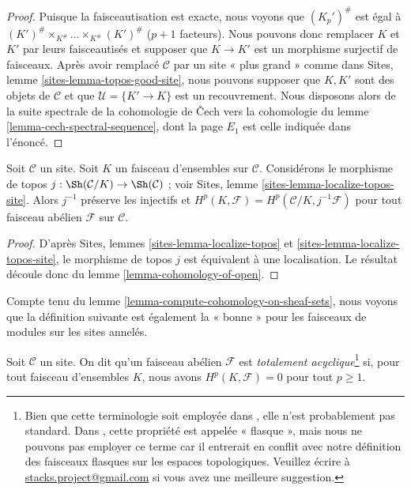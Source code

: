 \begin{proof}
Puisque la faisceautisation est exacte, nous voyons que
$(K_p')^\#$ est égal à
$(K')^\# \times_{K^\#} \ldots \times_{K^\#} (K')^\#$
($p + 1$ facteurs). Nous pouvons donc remplacer $K$ et $K'$ par leurs
faisceautisés et supposer que $K \to K'$ est un morphisme surjectif de
faisceaux. Après avoir remplacé $\mathcal{C}$ par un site « plus grand » comme
dans Sites, lemme \ref{sites-lemma-topos-good-site}, nous pouvons supposer que
$K, K'$ sont des objets de $\mathcal{C}$ et que
$\mathcal{U} = \{K' \to K\}$ est un recouvrement. Nous disposons alors de la
suite spectrale de la cohomologie de {\v C}ech vers la cohomologie du
lemme \ref{lemma-cech-spectral-sequence}, dont la page $E_1$ est celle indiquée
dans l'énoncé.
\end{proof}

\begin{lemma}
\label{lemma-cohomology-on-sheaf-sets}
Soit $\mathcal{C}$ un site. Soit $K$ un faisceau d'ensembles sur
$\mathcal{C}$. Considérons le morphisme de topos
$j : \Sh(\mathcal{C}/K) \to \Sh(\mathcal{C})$ ; voir
Sites, lemme \ref{sites-lemma-localize-topos-site}.
Alors $j^{-1}$ préserve les injectifs et
$H^p(K, \mathcal{F}) = H^p(\mathcal{C}/K, j^{-1}\mathcal{F})$
pour tout faisceau abélien $\mathcal{F}$ sur $\mathcal{C}$.
\end{lemma}

\begin{proof}
D'après Sites, lemmes \ref{sites-lemma-localize-topos} et
\ref{sites-lemma-localize-topos-site}, le morphisme de topos $j$ est équivalent
à une localisation. Le résultat découle donc du
lemme \ref{lemma-cohomology-of-open}.
\end{proof}

\noindent
Compte tenu du lemme \ref{lemma-compute-cohomology-on-sheaf-sets}, nous voyons
que la définition suivante est également la « bonne » pour les faisceaux de
modules sur les sites annelés.

\begin{definition}
\label{definition-limp}
Soit $\mathcal{C}$ un site.
On dit qu'un faisceau abélien $\mathcal{F}$ est
{\it totalement acyclique}\footnote{Bien que cette terminologie soit employée
dans \cite[Vbis, Proposition 1.3.10]{SGA4}, elle n'est probablement pas
standard. Dans \cite[V, définition 4.1]{SGA4}, cette propriété est appelée
« flasque », mais nous ne pouvons pas employer ce terme car il entrerait en
conflit avec notre définition des faisceaux flasques sur les espaces
topologiques. Veuillez écrire à
\href{mailto:stacks.project@gmail.com}{stacks.project@gmail.com}
si vous avez une meilleure suggestion.} si, pour tout faisceau d'ensembles
$K$, nous avons $H^p(K, \mathcal{F}) = 0$ pour tout $p \geq 1$.
\end{definition}

